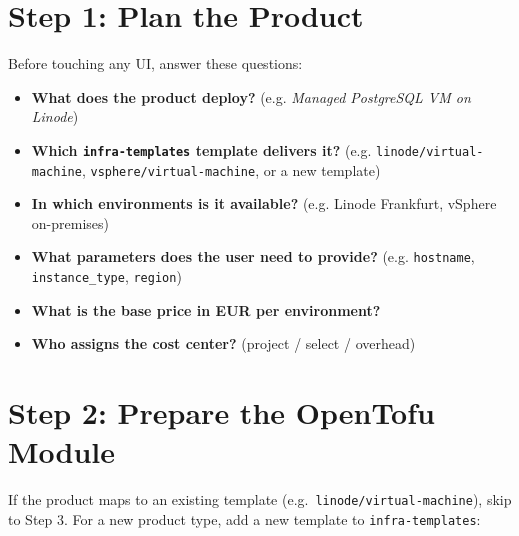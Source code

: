 \documentclass[12pt,a4paper,twoside]{report}
\newcommand{\code}[1]{\texttt{#1}}
\begin{document}
\section{Step 1: Plan the Product}

Before touching any UI, answer these questions:

\begin{itemize}
  \item \textbf{What does the product deploy?}
    (e.g. \textit{Managed PostgreSQL VM on Linode})
  \item \textbf{Which \code{infra-templates} template delivers it?}
    (e.g. \code{linode/virtual-machine}, \code{vsphere/virtual-machine}, or a new template)
  \item \textbf{In which environments is it available?}
    (e.g. Linode Frankfurt, vSphere on-premises)
  \item \textbf{What parameters does the user need to provide?}
    (e.g. \code{hostname}, \code{instance\_type}, \code{region})
  \item \textbf{What is the base price in EUR per environment?}
  \item \textbf{Who assigns the cost center?} (project / select / overhead)
\end{itemize}

\section{Step 2: Prepare the OpenTofu Module}

If the product maps to an existing template (e.g.\
\code{linode/virtual-machine}), skip to Step 3. For a new product type,
add a new template to \code{infra-templates}:
\end{document}
